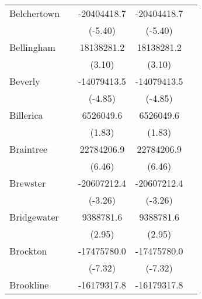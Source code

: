 {\begin{tabular}{l*{4}{c}}
\addlinespace
Belchertown         &                     & -20404418.7\sym{***}& -20404418.7\sym{***}&                     \\
                    &                     &     (-5.40)         &     (-5.40)         &                     \\
\addlinespace
Bellingham          &                     &  18138281.2\sym{**} &  18138281.2\sym{**} &                     \\
                    &                     &      (3.10)         &      (3.10)         &                     \\
\addlinespace
Beverly             &                     & -14079413.5\sym{***}& -14079413.5\sym{***}&                     \\
                    &                     &     (-4.85)         &     (-4.85)         &                     \\
\addlinespace
Billerica           &                     &   6526049.6         &   6526049.6         &                     \\
                    &                     &      (1.83)         &      (1.83)         &                     \\
\addlinespace
Braintree           &                     &  22784206.9\sym{***}&  22784206.9\sym{***}&                     \\
                    &                     &      (6.46)         &      (6.46)         &                     \\
\addlinespace
Brewster            &                     & -20607212.4\sym{**} & -20607212.4\sym{**} &                     \\
                    &                     &     (-3.26)         &     (-3.26)         &                     \\
\addlinespace
Bridgewater         &                     &   9388781.6\sym{**} &   9388781.6\sym{**} &                     \\
                    &                     &      (2.95)         &      (2.95)         &                     \\
\addlinespace
Brockton            &                     & -17475780.0\sym{***}& -17475780.0\sym{***}&                     \\
                    &                     &     (-7.32)         &     (-7.32)         &                     \\
\addlinespace
Brookline           &                     & -16179317.8\sym{**} & -16179317.8\sym{**} &                     \\

\end{tabular}}
